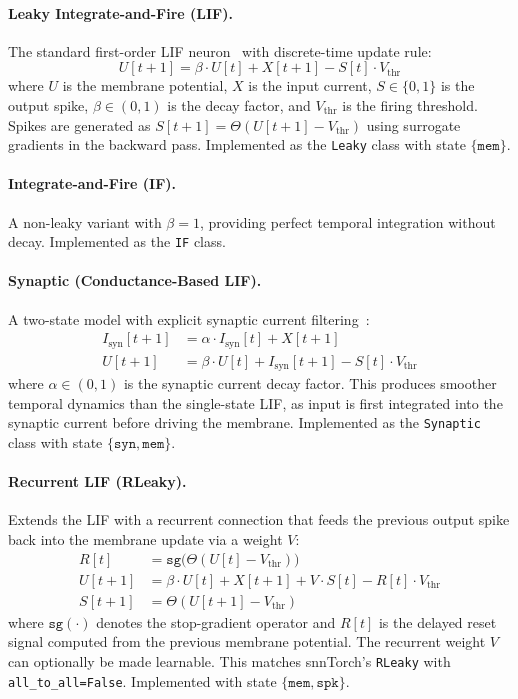 \documentclass[11pt]{article}
\begin{document}
\paragraph{Leaky Integrate-and-Fire (LIF).}
The standard first-order LIF neuron~\citep{gerstner2002spiking} with discrete-time update rule:
\begin{equation}
    U[t+1] = \beta \cdot U[t] + X[t+1] - S[t] \cdot V_{\text{thr}}
    \label{eq:lif}
\end{equation}
where $U$ is the membrane potential, $X$ is the input current, $S \in \{0,1\}$ is the output spike, $\beta \in (0,1)$ is the decay factor, and $V_{\text{thr}}$ is the firing threshold. Spikes are generated as $S[t+1] = \Theta(U[t+1] - V_{\text{thr}})$ using surrogate gradients in the backward pass. Implemented as the \texttt{Leaky} class with state $\{\texttt{mem}\}$.

\paragraph{Integrate-and-Fire (IF).}
A non-leaky variant with $\beta = 1$, providing perfect temporal integration without decay. Implemented as the \texttt{IF} class.

\paragraph{Synaptic (Conductance-Based LIF).}
A two-state model with explicit synaptic current filtering~\citep{gerstner2002spiking}:
\begin{align}
    I_{\text{syn}}[t+1] &= \alpha \cdot I_{\text{syn}}[t] + X[t+1] \label{eq:syn_i} \\
    U[t+1] &= \beta \cdot U[t] + I_{\text{syn}}[t+1] - S[t] \cdot V_{\text{thr}} \label{eq:syn_u}
\end{align}
where $\alpha \in (0,1)$ is the synaptic current decay factor. This produces smoother temporal dynamics than the single-state LIF, as input is first integrated into the synaptic current before driving the membrane. Implemented as the \texttt{Synaptic} class with state $\{\texttt{syn}, \texttt{mem}\}$.

\paragraph{Recurrent LIF (RLeaky).}
Extends the LIF with a recurrent connection that feeds the previous output spike back into the membrane update via a weight $V$:
\begin{align}
    R[t] &= \texttt{sg}\big(\Theta(U[t] - V_{\text{thr}})\big) \label{eq:rlif_reset} \\
    U[t+1] &= \beta \cdot U[t] + X[t+1] + V \cdot S[t] - R[t] \cdot V_{\text{thr}} \label{eq:rlif_mem} \\
    S[t+1] &= \Theta(U[t+1] - V_{\text{thr}}) \label{eq:rlif_spike}
\end{align}
where $\texttt{sg}(\cdot)$ denotes the stop-gradient operator and $R[t]$ is the delayed reset signal computed from the previous membrane potential. The recurrent weight $V$ can optionally be made learnable. This matches snnTorch's \texttt{RLeaky} with \texttt{all\_to\_all=False}. Implemented with state $\{\texttt{mem}, \texttt{spk}\}$.
\end{document}
